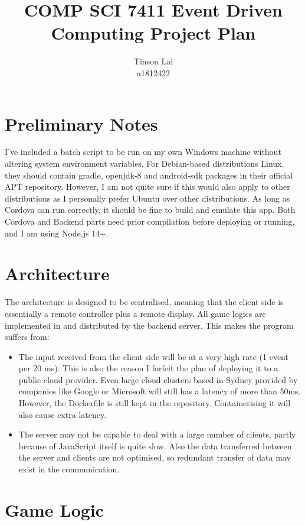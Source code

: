 \documentclass[12pt]{article}
\title{COMP SCI 7411 Event Driven Computing Project Plan}
\author{Tinson Lai \\ a1812422}
\date{}
\begin{document}
\maketitle

\section{Preliminary Notes}

I've included a batch script to be run on my own Windows machine without altering system environment variables. For Debian-based distributions Linux, they should contain gradle, openjdk-8 and android-sdk packages in their official APT repository. However, I am not quite sure if this would also apply to other distributions as I personally prefer Ubuntu over other distributions. As long as Cordova can run correctly, it should be fine to build and emulate this app. Both Cordova and Backend parts need prior compilation before deploying or running, and I am using Node.js 14+.

\section{Architecture}

The architecture is designed to be centralised, meaning that the client side is essentially a remote controller plus a remote display. All game logics are implemented in and distributed by the backend server. This makes the program suffers from:

\begin{itemize}
  \item The input received from the client side will be at a very high rate (1 event per 20 ms). This is also the reason I forfeit the plan of deploying it to a public cloud provider. Even large cloud clusters based in Sydney provided by companies like Google or Microsoft will still has a latency of more than 50ms. However, the Dockerfile is still kept in the repository. Containerising it will also cause extra latency.
  \item The server may not be capable to deal with a large number of clients, partly because of JavaScript itself is quite slow. Also the data transferred between the server and clients are not optimised, so redundant transfer of data may exist in the communication.
\end{itemize}

\section{Game Logic}
\end{document}
